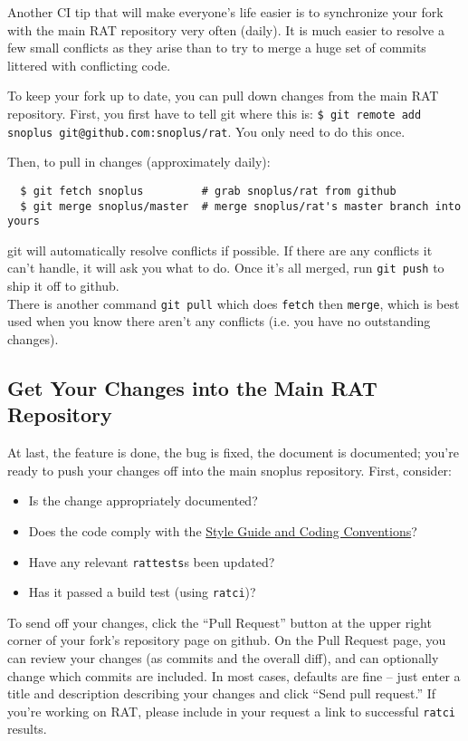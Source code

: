 \documentclass{article}
\begin{document}
Another CI tip that will make everyone's life easier is to synchronize your fork with the main RAT repository very often (daily). It is much easier to resolve a few small conflicts as they arise than to try to merge a huge set of commits littered with conflicting code.

To keep your fork up to date, you can pull down changes from the main RAT repository. First, you first have to tell git where this is: {\tt \$ git remote add snoplus git@github.com:snoplus/rat}. You only need to do this once.

Then, to pull in changes (approximately daily):
\begin{verbatim}
  $ git fetch snoplus         # grab snoplus/rat from github
  $ git merge snoplus/master  # merge snoplus/rat's master branch into yours
\end{verbatim}
git will automatically resolve conflicts if possible. If there are any conflicts it can't handle, it will ask you what to do. Once it's all merged, run {\tt git push} to ship it off to github.\\

There is another command {\tt git pull} which does {\tt fetch} then {\tt merge}, which is best used when you know there aren't any conflicts (i.e. you have no outstanding changes).

\subsection{Get Your Changes into the Main RAT Repository}
At last, the feature is done, the bug is fixed, the document is documented; you're ready to push your changes off into the main snoplus repository. First, consider:
\begin{itemize}
\item Is the change appropriately documented?
\item Does the code comply with the \href{https://www.snolab.ca/snoplus/private/DocDB/cgi/ShowDocument?docid=1018}{Style Guide and Coding Conventions}?
\item Have any relevant {\tt rattests}s been updated?
\item Has it passed a build test (using {\tt ratci})?
\end{itemize}

To send off your changes, click the ``Pull Request'' button at the upper right corner of your fork's repository page on github. On the Pull Request page, you can review your changes (as commits and the overall diff), and can optionally change which commits are included. In most cases, defaults are fine -- just enter a title and description describing your changes and click ``Send pull request.'' If you're working on RAT, please include in your request a link to successful {\tt ratci} results.\\
\end{document}
